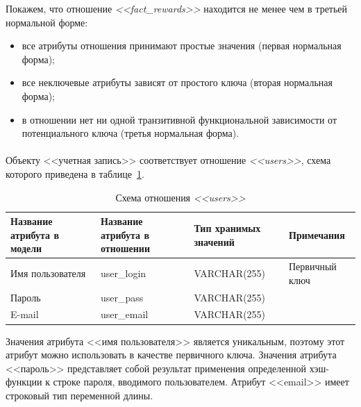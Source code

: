 Покажем, что отношение \textit{<<fact\_rewards>>} находится не менее чем в третьей нормальной форме:
\begin{itemize}
\item
  все атрибуты отношения принимают простые значения (первая нормальная форма);
\item
  все неключевые атрибуты зависят от простого ключа
  (вторая нормальная форма); 
\item
  в отношении нет ни одной транзитивной функциональной зависимости от потенциального ключа
  (третья нормальная форма).
\end{itemize}

\paragraph{}
Объекту <<учетная запись>> соответствует отношение \textit{<<users>>},
схема которого приведена в таблице~\ref{tbl:users_scheme}.

\begin{table}[h!]
  \caption{Схема отношения \textit{<<users>>}}
  \label{tbl:users_scheme}
  \small{
    \centering
    \begin{tabular}{| p{} | p{} | p{} | p{} |}
      \hline
      Название атрибута \newline в модели &
      Название атрибута \newline в отношении &
      Тип хранимых \newline значений &
      Примечания \\ \hline

      Имя пользователя &
      user\_login &
      VARCHAR(255) &
      Первичный ключ \\
      \hline

      Пароль &
      user\_pass &
      VARCHAR(255) & \\
      \hline

      E-mail &
      user\_email &
      VARCHAR(255) & \\
      \hline
    \end{tabular}
  }
\end{table}

Значения атрибута <<имя пользователя>> является уникальным, 
поэтому этот атрибут можно использовать в качестве первичного ключа.
Значения атрибута <<пароль>> представляет собой результат применения определенной хэш-функции
к строке пароля, вводимого пользователем.
Атрибут <<email>> имеет строковый тип переменной длины.

